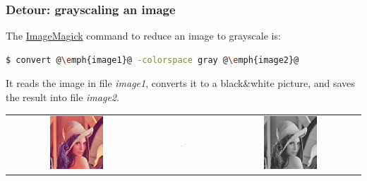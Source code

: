 \documentclass[english,serif,mathserif,xcolor=pdftex,dvipsnames,table]{beamer}
\begin{document}
\begin{frame}[fragile]
  \frametitle{Detour: grayscaling an image}
  The \href{http://www.imagemagick.org}{ImageMagick}
  command to reduce an image to grayscale is:
  \begin{lstlisting}[language=sh]
    $ convert @\emph{image1}@ -colorspace gray @\emph{image2}@
  \end{lstlisting}%
  
  \+ 
  It reads the image in file \emph{image1}, converts it to a
  black\&white picture, and saves the result into file \emph{image2}.

  \+
  \begin{tabular}[c]{ccc}
    \includegraphics[width=0.4\textwidth]{fig/lena}
    &
    \includegraphics[width=0.1\textwidth]{fig/arrow}
    &
    \includegraphics[width=0.4\textwidth]{fig/lena_gray}
  \end{tabular}
\end{frame}
\end{document}
